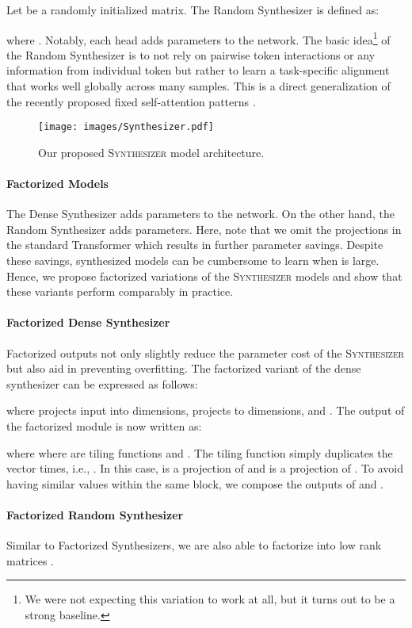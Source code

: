 \documentclass{article} \usepackage{iclr2021_conference,times}
\begin{document}
Let  be a randomly initialized matrix. The Random Synthesizer is defined as:

where . Notably, each head adds  parameters to the network. The basic idea\footnote{We were not expecting this variation to work at all, but it turns out to be a strong baseline.} of the Random Synthesizer is to not rely on pairwise token interactions or any information from individual token but rather to learn a task-specific alignment that works well globally across many samples. This is a direct generalization of the recently proposed fixed self-attention patterns \cite{raganato2020fixed}.

\begin{figure}[t]
\centering
     \texttt{[image: images/Synthesizer.pdf]}
    \label{fig:architecture}
    \caption{Our proposed \textsc{Synthesizer} model architecture.}
\end{figure}
\paragraph{Factorized Models} 
The Dense Synthesizer adds  parameters to the network. On the other hand, the Random Synthesizer adds  parameters. Here, note that we omit the  projections in the standard Transformer which results in further parameter savings. Despite these savings, synthesized models can be cumbersome to learn when  is large. Hence, we propose factorized variations of the \textsc{Synthesizer} models and show that these variants perform comparably in practice.
\paragraph{Factorized Dense Synthesizer}
Factorized outputs not only slightly reduce the parameter cost of the \textsc{Synthesizer} but also aid in preventing overfitting. The factorized variant of the dense synthesizer can be expressed as follows:

where  projects input  into  dimensions,  projects  to  dimensions, and . The output of the factorized module is now written as:

where  where  are tiling functions and . The tiling function simply duplicates the vector  times, i.e., . In this case,  is a projection of  and  is a projection of . To avoid having similar values within the same block, we compose the outputs of  and .


\paragraph{Factorized Random Synthesizer}
Similar to Factorized Synthesizers, we are also able to factorize  into low rank matrices .
\end{document}
